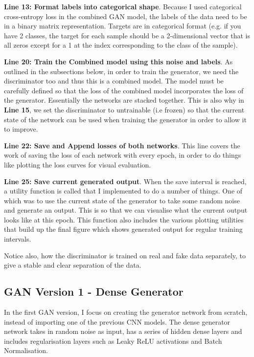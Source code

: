 \documentclass[12pt,a4paper,twoside]{report}
\begin{document}
\textbf{Line 13: Format labels into categorical shape}. Because I used categorical cross-entropy loss in the combined GAN model, the labels of the data need to be in a binary matrix representation. Targets are in categorical format (e.g. if you have 2 classes, the target for each sample should be a 2-dimensional vector that is all zeros except for a 1 at the index corresponding to the class of the sample).

\textbf{Line 20: Train the Combined model using this noise and labels}. As outlined in the subsections below, in order to train the generator, we need the discriminator too and thus this is a combined model. The model must be carefully defined so that the loss of the combined model incorporates the loss of the generator. Essentially the networks are stacked together. This is also why in \textbf{Line 15}, we set the discriminator to untrainable (i.e frozen) so that the current state of the network can be used when training the generator in order to allow it to improve. 

\textbf{Line 22: Save and Append losses of both networks}. This line covers the work of saving the loss of each network with every epoch, in order to do things like plotting the loss curves for visual evaluation.

\textbf{Line 25: Save current generated output}. When the save interval is reached, a utility function is called that I implemented to do a number of things. One of which was to use the current state of the generator to take some random noise and generate an output. This is so that we can visualise what the current output looks like at this epoch. This function also includes the various plotting utilities that build up the final figure which shows generated output for regular training intervals. 

Notice also, how the discriminator is trained on real and fake data separately, to give a stable and clear separation of the data.

\subsection{GAN Version 1 - Dense Generator}

In the first GAN version, I focus on creating the generator network from scratch, instead of importing one of the previous CNN models. The dense generator network takes in random noise as input, has a series of hidden dense layers and includes regularisation layers such as Leaky ReLU activations and Batch Normalisation.
\end{document}
